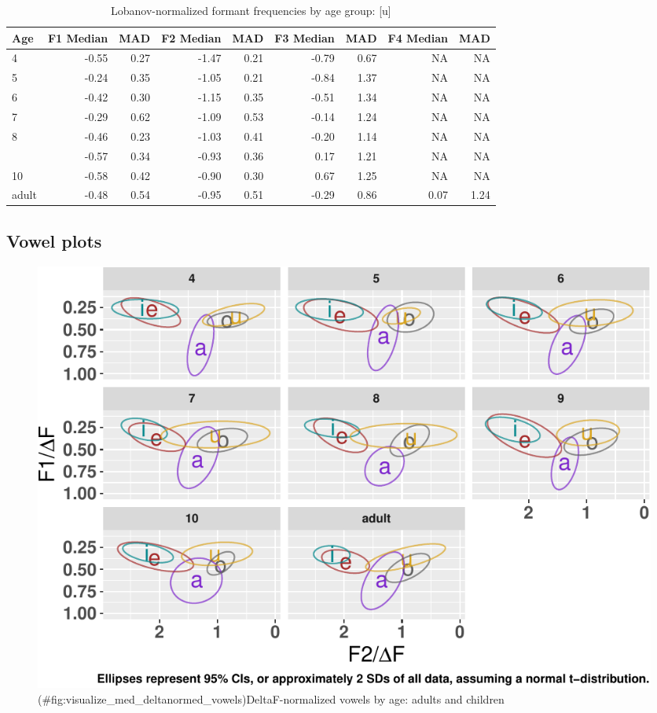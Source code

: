 \documentclass[
]{article}
\begin{document}
\begin{table}[!h]

\caption{\label{tab:lobanov-meas-tbl-u}Lobanov-normalized formant frequencies by age group: [u]}
\centering
\begin{tabular}[t]{lrrrrrrrr}
\toprule
Age & F1 Median & MAD & F2 Median & MAD & F3 Median & MAD & F4 Median & MAD\\
\midrule
4 & -0.55 & 0.27 & -1.47 & 0.21 & -0.79 & 0.67 & NA & NA\\
5 & -0.24 & 0.35 & -1.05 & 0.21 & -0.84 & 1.37 & NA & NA\\
6 & -0.42 & 0.30 & -1.15 & 0.35 & -0.51 & 1.34 & NA & NA\\
7 & -0.29 & 0.62 & -1.09 & 0.53 & -0.14 & 1.24 & NA & NA\\
8 & -0.46 & 0.23 & -1.03 & 0.41 & -0.20 & 1.14 & NA & NA\\
\addlinespace
9 & -0.57 & 0.34 & -0.93 & 0.36 & 0.17 & 1.21 & NA & NA\\
10 & -0.58 & 0.42 & -0.90 & 0.30 & 0.67 & 1.25 & NA & NA\\
adult & -0.48 & 0.54 & -0.95 & 0.51 & -0.29 & 0.86 & 0.07 & 1.24\\
\bottomrule
\end{tabular}
\end{table}

\hypertarget{vowel-plots}{%
\subsection{Vowel plots}\label{vowel-plots}}

\begin{figure}
\centering
\includegraphics{3_vtl_results_files/figure-latex/visualize_med_deltanormed_vowels-1.pdf}
\caption{(\#fig:visualize\_med\_deltanormed\_vowels)DeltaF-normalized vowels by age: adults and children}
\end{figure}
\end{document}
